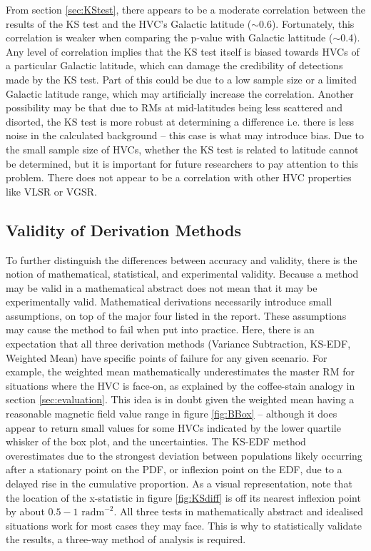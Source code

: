 From section \ref{sec:KStest}, there appears to be a moderate correlation between the results of the KS test and the HVC's Galactic latitude ($\sim$0.6). Fortunately, this correlation is weaker when comparing the p-value with Galactic lattitude ($\sim$0.4). Any level of correlation implies that the KS test itself is biased towards HVCs of a particular Galactic latitude, which can damage the credibility of detections made by the KS test. Part of this could be due to a low sample size or a limited Galactic latitude range, which may artificially increase the correlation. Another possibility may be that due to RMs at mid-latitudes being less scattered and disorted, the KS test is more robust at determining a difference i.e. there is less noise in the calculated background – this case is what may introduce bias. Due to the small sample size of HVCs, whether the KS test is related to latitude cannot be determined, but it is important for future researchers to pay attention to this problem. There does not appear to be a correlation with other HVC properties like VLSR or VGSR.

\subsection{Validity of Derivation Methods}
\label{ssec:B3}

To further distinguish the differences between accuracy and validity, there is the notion of mathematical, statistical, and experimental validity. Because a method may be valid in a mathematical abstract does not mean that it may be experimentally valid. Mathematical derivations necessarily introduce small assumptions, on top of the major four listed in the report. These assumptions may cause the method to fail when put into practice. Here, there is an expectation that all three derivation methods (Variance Subtraction, KS-EDF, Weighted Mean) have specific points of failure for any given scenario. For example, the weighted mean mathematically underestimates the master RM for situations where the HVC is face-on, as explained by the coffee-stain analogy in section \ref{sec:evaluation}. This idea is in doubt given the weighted mean having a reasonable magnetic field value range in figure \ref{fig:BBox} – although it does appear to return small values for some HVCs indicated by the lower quartile whisker of the box plot, and the uncertainties. The KS-EDF method overestimates due to the strongest deviation between populations likely occurring after a stationary point on the PDF, or inflexion point on the EDF, due to a delayed rise in the cumulative proportion. As a visual representation, note that the location of the x-statistic in figure \ref{fig:KSdiff} is off its nearest inflexion point by about $0.5-1$ $\mathrm{rad m}^{-2}$. All three tests in mathematically abstract and idealised situations work for most cases they may face. This is why to statistically validate the results, a three-way method of analysis is required.


